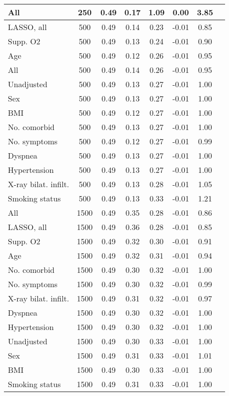 \documentclass{article}
\begin{document}
{\begin{longtable}{lccccccc}
All & 250 & 0.49 & 0.17 & 1.09 &  0.00 & 3.85 \\ \midrule 
LASSO, all & 500 & 0.49 & 0.14 & 0.23 & -0.01 & 0.85 \\ 
Supp. O2 & 500 & 0.49 & 0.13 & 0.24 & -0.01 & 0.90 \\ 
Age & 500 & 0.49 & 0.12 & 0.26 & -0.01 & 0.95 \\ 
All & 500 & 0.49 & 0.14 & 0.26 & -0.01 & 0.95 \\ 
Unadjusted & 500 & 0.49 & 0.13 & 0.27 & -0.01 & 1.00 \\ 
Sex & 500 & 0.49 & 0.13 & 0.27 & -0.01 & 1.00 \\ 
BMI & 500 & 0.49 & 0.12 & 0.27 & -0.01 & 1.00 \\ 
No. comorbid & 500 & 0.49 & 0.13 & 0.27 & -0.01 & 1.00 \\ 
No. symptoms & 500 & 0.49 & 0.12 & 0.27 & -0.01 & 0.99 \\ 
Dyspnea & 500 & 0.49 & 0.13 & 0.27 & -0.01 & 1.00 \\ 
Hypertension & 500 & 0.49 & 0.13 & 0.27 & -0.01 & 1.00 \\ 
X-ray bilat. infilt. & 500 & 0.49 & 0.13 & 0.28 & -0.01 & 1.05 \\ 
Smoking status & 500 & 0.49 & 0.13 & 0.33 & -0.01 & 1.21 \\ \midrule 
All & 1500 & 0.49 & 0.35 & 0.28 & -0.01 & 0.86 \\ 
LASSO, all & 1500 & 0.49 & 0.36 & 0.28 & -0.01 & 0.85 \\ 
Supp. O2 & 1500 & 0.49 & 0.32 & 0.30 & -0.01 & 0.91 \\ 
Age & 1500 & 0.49 & 0.32 & 0.31 & -0.01 & 0.94 \\ 
No. comorbid & 1500 & 0.49 & 0.30 & 0.32 & -0.01 & 1.00 \\ 
No. symptoms & 1500 & 0.49 & 0.30 & 0.32 & -0.01 & 0.99 \\ 
X-ray bilat. infilt. & 1500 & 0.49 & 0.31 & 0.32 & -0.01 & 0.97 \\ 
Dyspnea & 1500 & 0.49 & 0.30 & 0.32 & -0.01 & 1.00 \\ 
Hypertension & 1500 & 0.49 & 0.30 & 0.32 & -0.01 & 1.00 \\ 
Unadjusted & 1500 & 0.49 & 0.30 & 0.33 & -0.01 & 1.00 \\ 
Sex & 1500 & 0.49 & 0.31 & 0.33 & -0.01 & 1.01 \\ 
BMI & 1500 & 0.49 & 0.30 & 0.33 & -0.01 & 1.00 \\ 
Smoking status & 1500 & 0.49 & 0.31 & 0.33 & -0.01 & 1.00 \\
\bottomrule
\hline
\end{longtable}
}
\end{document}
